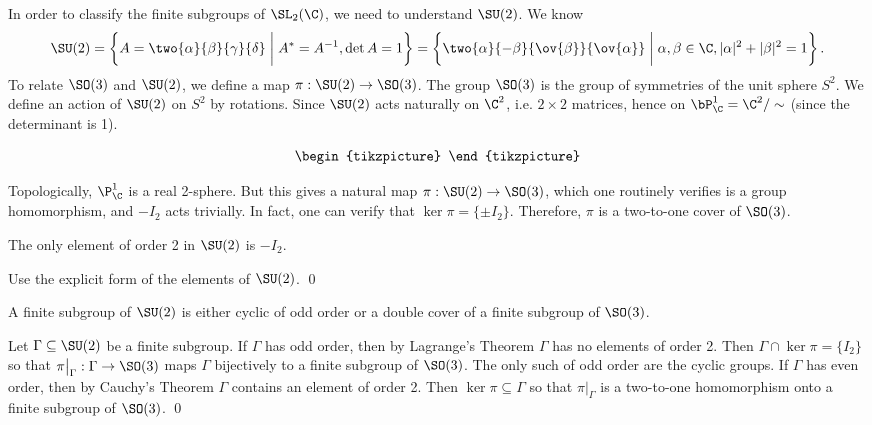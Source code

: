 In order to classify the finite subgroups of $\SL_2(\C)$, we need to understand $\SU(2)$. We know
	\[
	\begin{split}
	\SU(2)= \left\{ A = \two{\alpha}{\beta}{\gamma}{\delta} \;\bigg|\; A^*=A^{-1}, \det A=1 \right\}= \left\{ \two{\alpha}{-\beta}{\ov{\beta}}{\ov{\alpha}} \;\bigg|\; \alpha,\beta \in \C, |\alpha|^2+|\beta|^2=1 \right\}.
	\end{split}
	\]
To relate $\SO(3)$ and $\SU(2)$, we define a map $\pi: \SU(2) \to \SO(3)$. The group $\SO(3)$ is the group of symmetries of the unit sphere $S^2$. We define an action of $\SU(2)$ on $S^2$ by rotations. Since $\SU(2)$ acts naturally on $\C^2$, i.e. $2\times 2$ matrices, hence on $\bP^1_\C=\C^2/\sim$ (since the determinant is 1). 

	\[
	\begin{tikzpicture}
	
	\end{tikzpicture}
	\]

Topologically, $\P^1_\C$ is a real 2-sphere. But this gives a natural map $\pi: \SU(2) \to \SO(3)$, which one routinely verifies is a group homomorphism, and $-I_2$ acts trivially. In fact, one can verify that $\ker \pi= \{\pm I_2\}$. Therefore, $\pi$ is a two-to-one cover of $\SO(3)$. 


\begin{lem}
The only element of order 2 in $\SU(2)$ is $-I_2$.
\end{lem}

\pfsk Use the explicit form of the elements of $\SU(2)$. \qed \\


\begin{thm}
A finite subgroup of $\SU(2)$ is either cyclic of odd order or a double cover of a finite subgroup of $\SO(3)$. 
\end{thm}

\pf Let $\Gamma \subseteq \SU(2)$ be a finite subgroup. If $\Gamma$ has odd order, then by Lagrange's Theorem $\Gamma$ has no elements of order 2. Then $\Gamma \cap \ker \pi= \{I_2\}$ so that $\pi\big|_\Gamma: \Gamma \to \SO(3)$ maps $\Gamma$ bijectively to a finite subgroup of $\SO(3)$. The only such of odd order are the cyclic groups. If $\Gamma$ has even order, then by Cauchy's Theorem $\Gamma$ contains an element of order 2. Then $\ker \pi \subseteq \Gamma$ so that $\pi\big|_\Gamma$ is a two-to-one homomorphism onto a finite subgroup of $\SO(3)$. \qed \\



